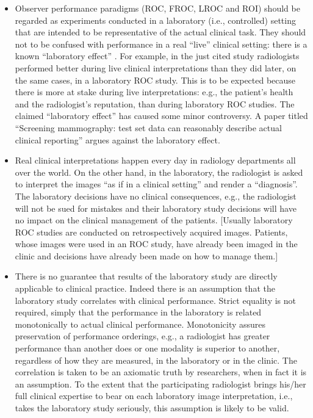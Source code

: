 \documentclass[
]{book}
\begin{document}
\begin{itemize}
\item
  Observer performance paradigms (ROC, FROC, LROC and ROI) should be regarded as experiments conducted in a laboratory (i.e., controlled) setting that are intended to be representative of the actual clinical task. They should not to be confused with performance in a real ``live'' clinical setting: there is a known ``laboratory effect'' \citep{RN2026}. For example, in the just cited study radiologists performed better during live clinical interpretations than they did later, on the same cases, in a laboratory ROC study. This is to be expected because there is more at stake during live interpretations: e.g., the patient's health and the radiologist's reputation, than during laboratory ROC studies. The claimed ``laboratory effect'' has caused some minor controversy. A paper \citep{RN2373} titled ``Screening mammography: test set data can reasonably describe actual clinical reporting'' argues against the laboratory effect.
\item
  Real clinical interpretations happen every day in radiology departments all over the world. On the other hand, in the laboratory, the radiologist is asked to interpret the images ``as if in a clinical setting'' and render a ``diagnosis''. The laboratory decisions have no clinical consequences, e.g., the radiologist will not be sued for mistakes and their laboratory study decisions will have no impact on the clinical management of the patients. {[}Usually laboratory ROC studies are conducted on retrospectively acquired images. Patients, whose images were used in an ROC study, have already been imaged in the clinic and decisions have already been made on how to manage them.{]}
\item
  There is no guarantee that results of the laboratory study are directly applicable to clinical practice. Indeed there is an assumption that the laboratory study correlates with clinical performance. Strict equality is not required, simply that the performance in the laboratory is related monotonically to actual clinical performance. Monotonicity assures preservation of performance orderings, e.g., a radiologist has greater performance than another does or one modality is superior to another, regardless of how they are measured, in the laboratory or in the clinic. The correlation is taken to be an axiomatic truth by researchers, when in fact it is an assumption. To the extent that the participating radiologist brings his/her full clinical expertise to bear on each laboratory image interpretation, i.e., takes the laboratory study seriously, this assumption is likely to be valid.

\end{itemize}
\end{document}
